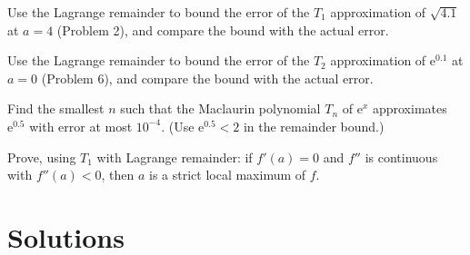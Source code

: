 \begin{problems}
  \item Use the Lagrange remainder to bound the error of the $T_{1}$
        approximation of $\sqrt{4.1}$ at $a=4$ (Problem 2), and compare
        the bound with the actual error.
  \item Use the Lagrange remainder to bound the error of the $T_{2}$
        approximation of $\mathrm{e}^{0.1}$ at $a=0$ (Problem 6), and
        compare the bound with the actual error.
  \item Find the smallest $n$ such that the Maclaurin polynomial
        $T_{n}$ of $\mathrm{e}^{x}$ approximates $\mathrm{e}^{0.5}$
        with error at most $10^{-4}$. (Use $\mathrm{e}^{0.5}<2$ in the
        remainder bound.)
  \item Prove, using $T_{1}$ with Lagrange remainder: if $f'(a)=0$ and
        $f''$ is continuous with $f''(a)<0$, then $a$ is a strict local
        maximum of $f$.
\end{problems}

\section{Solutions}

